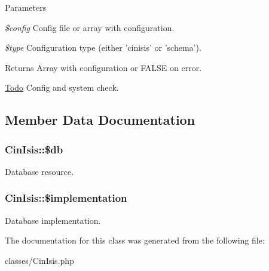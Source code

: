\begin{DoxyParams}{Parameters}
\item[{\em \$config}]Config file or array with configuration.\item[{\em \$type}]Configuration type (either 'cinisis' or 'schema').\end{DoxyParams}
\begin{DoxyReturn}{Returns}
Array with configuration or FALSE on error.
\end{DoxyReturn}
\begin{Desc}
\item[\hyperlink{todo__todo000001}{Todo}]Config and system check. \end{Desc}


\subsection{Member Data Documentation}
\hypertarget{classCinIsis_ada0e16c222436f776f040e0fe1a25184}{
\subsubsection[{\$db}]{\setlength{\rightskip}{0pt plus 5cm}CinIsis::\$db}}
\label{classCinIsis_ada0e16c222436f776f040e0fe1a25184}
Database resource. \hypertarget{classCinIsis_aea1086b32d45308f6875f6ed0a6db2fc}{
\subsubsection[{\$implementation}]{\setlength{\rightskip}{0pt plus 5cm}CinIsis::\$implementation}}
\label{classCinIsis_aea1086b32d45308f6875f6ed0a6db2fc}
Database implementation. 

The documentation for this class was generated from the following file:\begin{DoxyCompactItemize}
\item 
classes/CinIsis.php\end{DoxyCompactItemize}
